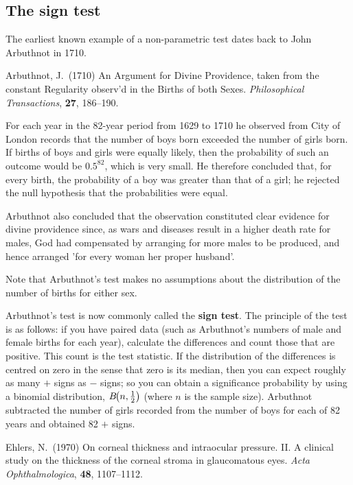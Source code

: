 \subsection{The sign test}
The earliest known example of a non-parametric test dates back to John Arbuthnot in 1710.
\begin{marginnoteblock}
  Arbuthnot, J.\ (1710) An Argument for Divine Providence, taken from the constant Regularity observ'd in the Births of both Sexes.
  \textit{Philosophical Transactions}, \textbf{27}, 186--190.
\end{marginnoteblock}
For each year in the 82-year period from 1629 to 1710 he observed from City of London records that the number of boys born exceeded the number of girls born.
If births of boys and girls were equally likely, then the probability of such an outcome would be $0.5^{82}$, which is very small.
He therefore concluded that, for every birth, the probability of a boy was greater than that of a girl; he rejected the null hypothesis that the probabilities were equal.
\begin{marginnoteblock}
Arbuthnot also concluded that the observation constituted clear evidence for divine providence since, as wars and diseases result in a higher death rate for males, God had compensated by arranging for more males to be produced, and hence arranged 'for every woman her proper husband'.
\end{marginnoteblock}
Note that Arbuthnot's test makes no assumptions about the distribution of the number of births for either sex.

Arbuthnot's test is now commonly called the \textbf{sign test}.
The principle of the test is as follows: if you have paired data (such as Arbuthnot's numbers of male and female births for each year), calculate the differences and count those that are positive.
This count is the test statistic.
%
If the distribution of the differences is centred on zero in the sense that zero is its median, then you can expect roughly as many $+$ signs as $-$ signs; so you can obtain a significance probability by using a binomial distribution, ${B\hspace*{-3pt}\left(n,\frac12\right)}$ (where $n$ is the sample size).
Arbuthnot subtracted the number of girls recorded from the number of boys for each of 82 years and obtained 82 $+$ signs.

\begin{marginnoteblock}
  Ehlers, N.\ (1970) On corneal thickness and intraocular pressure. II.
  A clinical study on the thickness of the corneal stroma in glaucomatous eyes.
  \emph{Acta Ophthalmologica}, \textbf{48}, 1107--1112.
\end{marginnoteblock}


